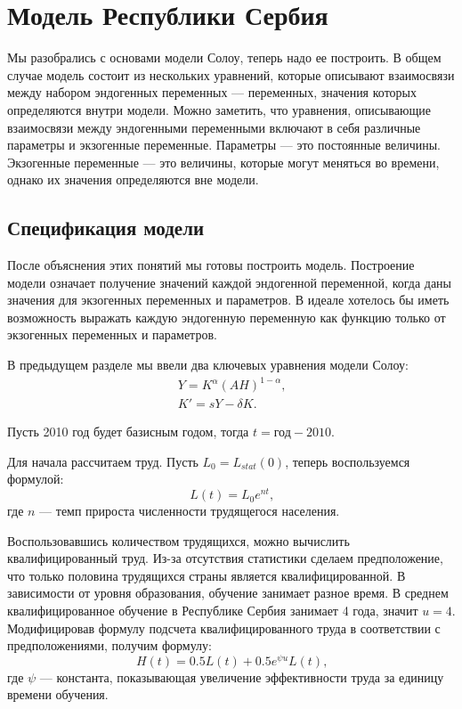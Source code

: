 \chapter{Модель Республики Сербия}

Мы разобрались с основами модели Солоу, теперь надо ее построить.
В общем случае модель состоит из нескольких уравнений, которые описывают взаимосвязи между набором эндогенных переменных --- переменных, значения которых определяются внутри модели.
Можно заметить, что уравнения, описывающие взаимосвязи между эндогенными переменными включают в себя различные параметры и экзогенные переменные.
Параметры --- это постоянные величины.
Экзогенные переменные --- это величины, которые могут меняться во времени, однако их значения определяются вне модели.

\section{Спецификация модели}

После объяснения этих понятий мы готовы построить модель.
Построение модели означает получение значений каждой эндогенной переменной, когда даны значения для экзогенных переменных и параметров.
В идеале хотелось бы иметь возможность выражать каждую эндогенную переменную как функцию только от экзогенных переменных и параметров.

В предыдущем разделе мы ввели два ключевых уравнения модели Солоу:
\begin{align*}
	Y=K^{\alpha}(AH)^{1-\alpha}\text{,}\\
	K'=sY - \delta K \text{.}
\end{align*}

Пусть 2010 год будет базисным годом, тогда $t = \text{год} - 2010$.

Для начала рассчитаем труд.
Пусть $L_0 = L_{stat}(0)$, теперь воспользуемся формулой:
\begin{equation*}
	L(t) = L_0 e^{nt}\text{,}
\end{equation*}
где $n$ --- темп прироста численности трудящегося населения.

Воспользовавшись количеством трудящихся, можно вычислить квалифицированный труд.
Из-за отсутствия статистики сделаем предположение, что только половина трудящихся страны является квалифицированной.
В зависимости от уровня образования, обучение занимает разное время.
В среднем квалифицированное обучение в Республике Сербия занимает 4 года, значит $u = 4$.
Модифицировав формулу подсчета квалифицированного труда в соответствии с предположениями, получим формулу:
\begin{equation*}
H(t) = 0.5L(t) + 0.5 e^{\psi u}L(t)\text{,}
\end{equation*}
где $\psi$ --- константа, показывающая увеличение эффективности труда за единицу времени обучения.

